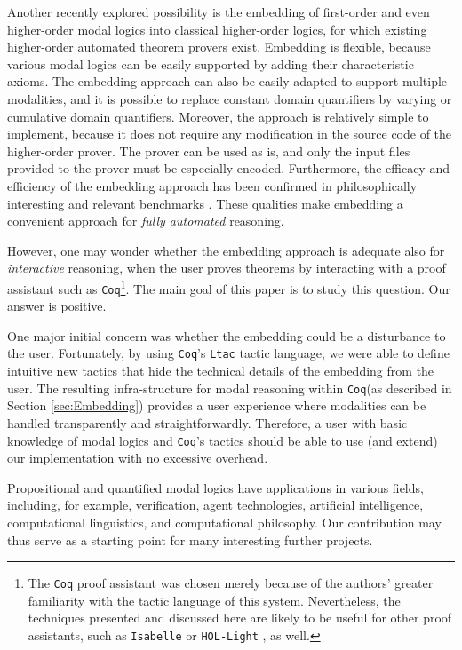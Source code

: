 \documentclass{llncs}
\newcommand{\Coq}{\texttt{Coq}\xspace}
\begin{document}
Another recently explored possibility \cite{J23,B9,J22} is the
embedding of first-order and even higher-order modal logics into classical
higher-order logics, for which existing higher-order automated theorem
provers \cite{LEO-II,Satallax} exist.  Embedding is flexible,
because various modal logics can be easily supported by adding their
characteristic axioms.  The embedding approach can also be easily
adapted to support multiple modalities, and it is possible to replace
constant domain quantifiers by varying or cumulative domain
quantifiers.  Moreover, the approach is relatively simple to
implement, because it does not require any modification in the source
code of the higher-order prover. The prover can be used as is, and
only the input files provided to the prover must be especially
encoded. Furthermore, the efficacy and efficiency of the embedding
approach has been confirmed in philosophically interesting and
relevant benchmarks \cite{FormalTheologyRepository}. These qualities
make embedding a convenient approach for \emph{fully automated}
reasoning.

However, one may wonder whether the embedding approach is adequate
also for \emph{interactive} reasoning, when the user proves theorems
by interacting with a proof assistant such as \Coq\footnote{The \Coq
proof assistant was chosen merely because of the authors' greater
familiarity with the tactic language of this system. Nevertheless, the
techniques presented and discussed here are likely to be useful for
other proof assistants, such as \texttt{Isabelle} \cite{Isabelle} or
\texttt{HOL-Light} \cite{HOLLight}, as well.}. The main goal of this
paper is to study this question. Our answer is positive.


One major initial concern was whether the embedding could be a
disturbance to the user. Fortunately, by using \Coq's \texttt{Ltac}
tactic language, we were able to define intuitive new tactics that
hide the technical details of the embedding from the user. The
resulting infra-structure for modal reasoning within \Coq (as
described in Section \ref{sec:Embedding}) provides a user experience where
modalities can be handled transparently and straightforwardly.
Therefore, a user with basic knowledge of modal logics and \Coq's
tactics should be able to use (and extend) our implementation with no
excessive overhead.

Propositional and quantified modal logics have applications in various
fields, including, for example, verification, agent technologies,
artificial intelligence, computational linguistics, and computational
philosophy. Our contribution may thus serve as a starting point for
many interesting further projects.
\end{document}

